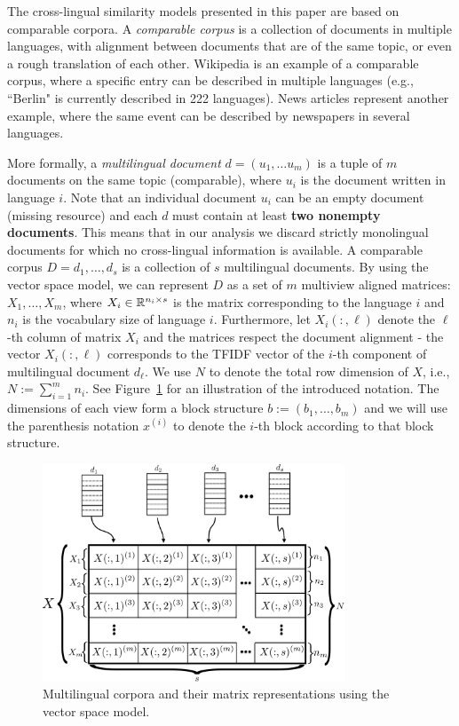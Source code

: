 The cross-lingual similarity models presented in this paper are based on comparable corpora.
A \emph{comparable corpus} is a collection of documents in multiple languages, with alignment
between documents that are of the same topic, or even a rough translation of each other.
Wikipedia is an example of a comparable corpus, where a specific entry can be described in multiple
languages (e.g., ``Berlin" is currently described in 222 languages). News articles represent
another example, where the same event can be described by newspapers in several languages.

More formally, a \emph{multilingual document} $d = (u_1,\ldots u_m)$ is a tuple of $m$ documents
on the same topic (comparable), where $u_i$ is the document written in language $i$. Note that
an individual document $u_i$ can be an empty document (missing resource) and each $d$ must contain
at least \textbf{two nonempty documents}. This means that in our analysis we discard strictly
monolingual documents for which no cross-lingual information is available. A comparable corpus
$D = {d_1, \ldots, d_s}$ is a collection of $s$ multilingual documents. By using the vector space
model, we can represent $D$ as a set of $m$ multiview aligned matrices:
$X_1,\ldots,X_m$, where $X_i \in \mathbb{R}^{n_i \times s}$
is the matrix corresponding to the language $i$ and $n_i$ is the vocabulary size of language $i$.
Furthermore, let $X_i(:,\ell)$ denote the $\ell$-th column of matrix $X_i$ and the matrices respect
the document alignment - the vector $X_i(:,\ell)$ corresponds to the TFIDF vector of the $i$-th component
of multilingual document $d_\ell$. We use $N$ to denote the total row dimension of $X$, i.e.,
$N:= \sum_{i=1}^m n_i$. See Figure~\ref{fig:stacked_matrices} for an illustration of the introduced notation.
The dimensions of each view form a block structure $b := (b_1, \ldots, b_m)$ and we will use the parenthesis
notation $x^{(i)}$ to denote the $i$-th block according to that block structure.

\begin{figure}[tbp]
\centering
\includegraphics[width=9cm]{figures/stacked_matrices1-crop.pdf}
\caption[Multilingual corpus matrices]{Multilingual corpora and their matrix representations using the vector space model.}
\label{fig:stacked_matrices}
\end{figure}

